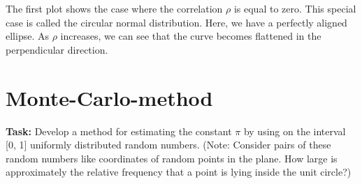 \noindent The first plot shows the case where the correlation $\rho$ is equal to zero. This special case is called the circular normal distribution. Here, we have a perfectly aligned ellipse. As $\rho$ increases, we can see that the curve becomes flattened in the perpendicular direction.

\section{Monte-Carlo-method}
\noindent \textbf{Task:} Develop a method for estimating the constant $\pi$ by using on the interval [0, 1] uniformly distributed random numbers. (Note: Consider pairs of these random numbers like coordinates of random points in the plane. How large is approximately the relative frequency that a point is lying inside the unit circle?) 

